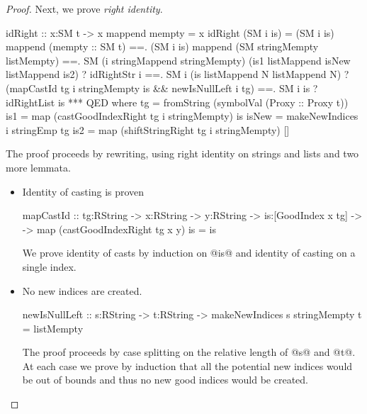 \begin{proof}
Next, we prove \textit{right identity}.
\begin{code}
idRight :: x:SM t -> {x mappend mempty = x }
idRight (SM i is)
  =   (SM i is) mappend (mempty :: SM t)
  ==. (SM i is) mappend (SM stringMempty listMempty)
  ==. SM (i stringMappend stringMempty) (is1 listMappend isNew listMappend is2)
      ? idRightStr i
  ==. SM i (is listMappend N listMappend N)
      ? (mapCastId tg i stringMempty is && newIsNullLeft i tg)
  ==. SM i is
      ? idRightList is
  ***  QED
  where
    tg    = fromString (symbolVal (Proxy :: Proxy t))
    is1   = map (castGoodIndexRight tg i stringMempty) is
    isNew = makeNewIndices i stringEmp tg
    is2   = map (shiftStringRight tg i stringMempty) []
\end{code}
The proof proceeds by rewriting,
using right identity on strings and lists and two more lemmata.
\begin{itemize}
\item Identity of casting is proven
\begin{code}
mapCastId :: tg:RString -> x:RString -> y:RString
  -> is:[GoodIndex x tg] ->
  -> {map (castGoodIndexRight tg x y) is = is}
\end{code}
We prove identity of casts by induction on @is@ and
identity of casting on a single index.
\item No new indices are created.
\begin{code}
newIsNullLeft :: s:RString -> t:RString
  -> {makeNewIndices s stringMempty t = listMempty }
\end{code}
The proof proceeds by case splitting
on the relative length of @s@ and @t@.
At each case we prove by induction that all
the potential new indices would be out of bounds and thus
no new good indices would be created.
\end{itemize}


\end{proof}
